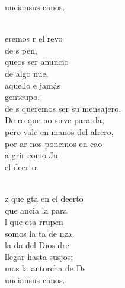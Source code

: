 \documentclass[12pt]{article}
\begin{document}
\begin{multicols*}{2}
\begin{cancion}
\begin{chorus}
	unciansus canos.   \\
	\end{chorus}%
	\jump\\
	eremos r el revo \\
	de s pen,   \\
	queos ser anuncio\\
	de algo nue,   \\
	 aquello e jamás \\
	 genteupo,    \\
	de s queremos ser su mensajero.\\
	De ro que no sirve para da,\\
	pero  vale en manos del alrero,\\
	por ar nos ponemos en cao\\
	a grir como Ju  \\
	el deerto.   \\\jump\\
	\begin{chorus}%
	z que gta en el deerto  \\
	 que ancia la para\\
	l que eta rrupcn \\
	somos la ta de nza.   \\
	 la da del Dios dre   \\
	 llegar hasta susjos;\\
	mos la antorcha de Ds\\
	unciansus canos.   \\
	\end{chorus}%
	\jump\\
\end{cancion}%


\end{multicols*}
\end{document}
